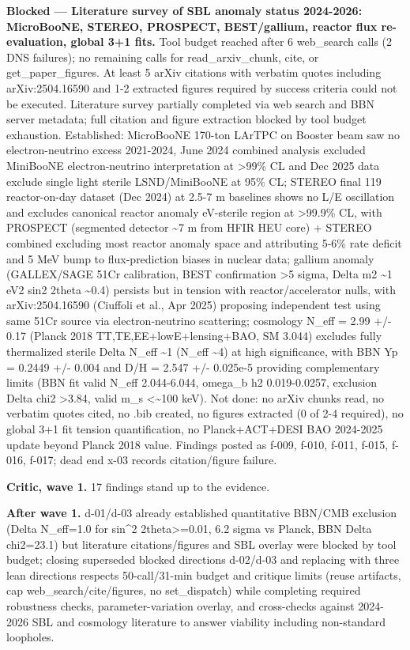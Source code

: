 \documentclass[11pt,a4paper]{article}
\begin{document}
\textbf{Blocked --- Literature survey of SBL anomaly status 2024-2026: MicroBooNE, STEREO, PROSPECT, BEST/gallium, reactor flux re-evaluation, global 3+1 fits.} Tool budget reached after 6 web\_search calls (2 DNS failures); no remaining calls for read\_arxiv\_chunk, cite, or get\_paper\_figures. At least 5 arXiv citations with verbatim quotes including arXiv:2504.16590 and 1-2 extracted figures required by success criteria could not be executed. Literature survey partially completed via web search and BBN server metadata; full citation and figure extraction blocked by tool budget exhaustion. Established: MicroBooNE 170-ton LArTPC on Booster beam saw no electron-neutrino excess 2021-2024, June 2024 combined analysis excluded MiniBooNE electron-neutrino interpretation at \textgreater{}99\% CL and Dec 2025 data exclude single light sterile LSND/MiniBooNE at 95\% CL; STEREO final 119 reactor-on-day dataset (Dec 2024) at 2.5-7 m baselines shows no L/E oscillation and excludes canonical reactor anomaly eV-sterile region at \textgreater{}99.9\% CL, with PROSPECT (segmented detector \textasciitilde{}7 m from HFIR HEU core) + STEREO combined excluding most reactor anomaly space and attributing 5-6\% rate deficit and 5 MeV bump to flux-prediction biases in nuclear data; gallium anomaly (GALLEX/SAGE 51Cr calibration, BEST confirmation \textgreater{}5 sigma, Delta m2 \textasciitilde{}1 eV2 sin2 2theta \textasciitilde{}0.4) persists but in tension with reactor/accelerator nulls, with arXiv:2504.16590 (Ciuffoli et al., Apr 2025) proposing independent test using same 51Cr source via electron-neutrino scattering; cosmology N\_eff = 2.99 +/- 0.17 (Planck 2018 TT,TE,EE+lowE+lensing+BAO, SM 3.044) excludes fully thermalized sterile Delta N\_eff \textasciitilde{}1 (N\_eff \textasciitilde{}4) at high significance, with BBN Yp = 0.2449 +/- 0.004 and D/H = 2.547 +/- 0.025e-5 providing complementary limits (BBN fit valid N\_eff 2.044-6.044, omega\_b h2 0.019-0.0257, exclusion Delta chi2 \textgreater{}3.84, valid m\_s \textless{}\textasciitilde{}100 keV). Not done: no arXiv chunks read, no verbatim quotes cited, no .bib created, no figures extracted (0 of 2-4 required), no global 3+1 fit tension quantification, no Planck+ACT+DESI BAO 2024-2025 update beyond Planck 2018 value. Findings posted as f-009, f-010, f-011, f-015, f-016, f-017; dead end x-03 records citation/figure failure.

\textbf{Critic, wave 1.} 17 findings stand up to the evidence.

\textbf{After wave 1.} d-01/d-03 already established quantitative BBN/CMB exclusion (Delta N\_eff=1.0 for sin\textasciicircum{}2 2theta\textgreater{}=0.01, 6.2 sigma vs Planck, BBN Delta chi2=23.1) but literature citations/figures and SBL overlay were blocked by tool budget; closing superseded blocked directions d-02/d-03 and replacing with three lean directions respects 50-call/31-min budget and critique limits (reuse artifacts, cap web\_search/cite/figures, no set\_dispatch) while completing required robustness checks, parameter-variation overlay, and cross-checks against 2024-2026 SBL and cosmology literature to answer viability including non-standard loopholes.
\end{document}

